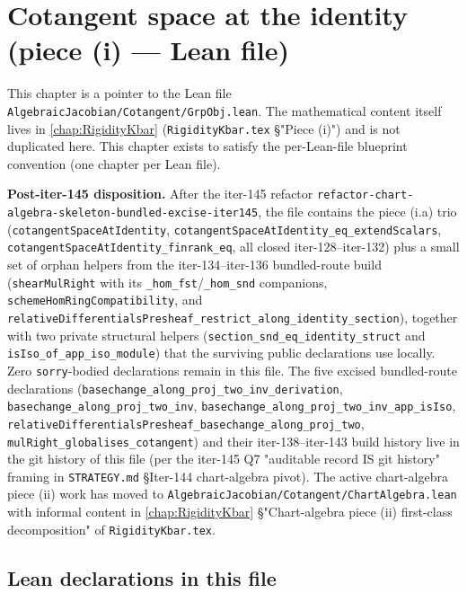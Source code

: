 \chapter{Cotangent space at the identity (piece (i) --- Lean file)}
\label{chap:cotangent-grpobj}

\providecommand{\obj}{\mathrm{obj}}
\providecommand{\toUnit}{\mathrm{toUnit}}

This chapter is a pointer to the Lean file
\texttt{AlgebraicJacobian/Cotangent/GrpObj.lean}. The mathematical content
itself lives in \cref{chap:RigidityKbar} (\texttt{RigidityKbar.tex}
\S "Piece (i)") and is not duplicated here. This chapter exists to satisfy
the per-Lean-file blueprint convention (one chapter per Lean file).

\textbf{Post-iter-145 disposition.} After the iter-145 refactor
\texttt{refactor-chart-algebra-skeleton-bundled-excise-iter145}, the
file contains the piece (i.a) trio
(\texttt{cotangentSpaceAtIdentity},
\texttt{cotangentSpaceAtIdentity\_eq\_extendScalars},
\texttt{cotangentSpaceAtIdentity\_finrank\_eq}, all closed
iter-128--iter-132) plus a small set of orphan helpers from the
iter-134--iter-136 bundled-route build
(\texttt{shearMulRight} with its \texttt{\_hom\_fst}/\texttt{\_hom\_snd}
companions, \texttt{schemeHomRingCompatibility}, and
\texttt{relativeDifferentialsPresheaf\_restrict\_along\_identity\_section}),
together with two private structural helpers
(\texttt{section\_snd\_eq\_identity\_struct} and
\texttt{isIso\_of\_app\_iso\_module}) that the surviving public
declarations use locally. Zero \texttt{sorry}-bodied declarations
remain in this file. The five excised bundled-route declarations
(\texttt{basechange\_along\_proj\_two\_inv\_derivation},
\texttt{basechange\_along\_proj\_two\_inv},
\texttt{basechange\_along\_proj\_two\_inv\_app\_isIso},
\texttt{relativeDifferentialsPresheaf\_basechange\_along\_proj\_two},
\texttt{mulRight\_globalises\_cotangent}) and their iter-138--iter-143
build history live in the git history of this file (per the iter-145
Q7 "auditable record IS git history" framing in \texttt{STRATEGY.md}
\S Iter-144 chart-algebra pivot). The active chart-algebra piece (ii)
work has moved to \texttt{AlgebraicJacobian/Cotangent/ChartAlgebra.lean}
with informal content in \cref{chap:RigidityKbar} \S "Chart-algebra
piece (ii) first-class decomposition" of \texttt{RigidityKbar.tex}.

\section{Lean declarations in this file}

